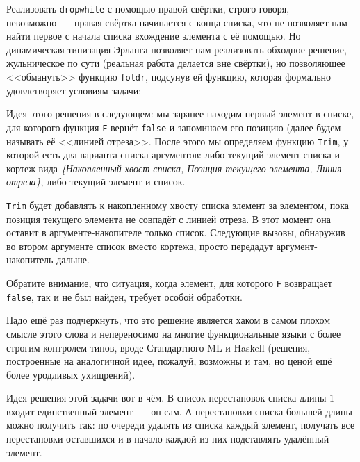 \documentclass[
  paper=a4,
  fontsize=14pt,
  openany,
  appendixprefix=true
]{scrbook}
\begin{document}


Реализовать \lstinline{dropwhile} с помощью правой свёртки, строго говоря, невозможно~--- правая свёртка начинается с конца списка, что не позволяет нам найти первое с начала списка вхождение элемента с её помощью. Но динамическая типизация Эрланга позволяет нам реализовать обходное решение, жульническое по сути (реальная работа делается вне свёртки), но позволяющее <<обмануть>> функцию \lstinline{foldr}, подсунув ей функцию, которая формально удовлетворяет условиям задачи:



Идея этого решения в следующем: мы заранее находим первый элемент в списке, для которого функция \lstinline{F} вернёт \lstinline{false} и запоминаем его позицию (далее будем называть её <<линией отреза>>. После этого мы определяем функцию \lstinline{Trim}, у которой есть два варианта списка аргументов: либо текущий элемент списка и кортеж вида {\em \{Накопленный хвост списка, Позиция текущего элемента, Линия отреза\}}, либо текущий элемент и список.

\lstinline{Trim} будет добавлять к накопленному хвосту списка элемент за элементом, пока позиция текущего элемента не совпадёт с линией отреза. В этот момент она оставит в аргументе-накопителе только список. Следующие вызовы, обнаружив во втором аргументе список вместо кортежа, просто передадут аргумент-накопитель дальше.

Обратите внимание, что ситуация, когда элемент, для которого \lstinline{F} возвращает \lstinline{false}, так и не был найден, требует особой обработки.

Надо ещё раз подчеркнуть, что это решение является хаком в самом плохом смысле этого слова и непереносимо на многие функциональные языки с более строгим контролем типов, вроде Стандартного ML и Haskell (решения, построенные на аналогичной идее, пожалуй, возможны и там, но ценой ещё более уродливых ухищрений).


Идея решения этой задачи вот в чём. В список перестановок списка длины $1$ входит единственный элемент~--- он сам. А перестановки списка большей длины можно получить так: по очереди удалять из списка каждый элемент, получать все перестановки оставшихся и в начало каждой из них подставлять удалённый элемент.

\end{document}
